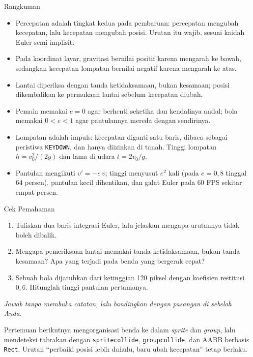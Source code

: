 \documentclass[aspectratio=169,10pt]{beamer}
\begin{document}
\begin{frame}{Rangkuman}
\begin{itemize}
  \item Percepatan adalah tingkat kedua pada pembaruan: percepatan mengubah
        kecepatan, lalu kecepatan mengubah posisi. Urutan itu wajib, sesuai
        kaidah Euler semi-implisit.
  \item Pada koordinat layar, gravitasi bernilai positif karena mengarah ke
        bawah, sedangkan kecepatan lompatan bernilai negatif karena mengarah
        ke atas.
  \item Lantai diperiksa dengan tanda ketidaksamaan, bukan kesamaan; posisi
        dikembalikan ke permukaan lantai sebelum kecepatan diubah.
  \item Pemain memakai $e = 0$ agar berhenti seketika dan kendalinya andal;
        bola memakai $0 < e < 1$ agar pantulannya mereda dengan sendirinya.
  \item Lompatan adalah impuls: kecepatan diganti satu baris, dibaca sebagai
        peristiwa \texttt{KEYDOWN}, dan hanya diizinkan di tanah. Tinggi
        lompatan $h = v_0^2/(2g)$ dan lama di udara $t = 2v_0/g$.
  \item Pantulan mengikuti $v' = -e\,v$; tinggi menyusut $e^2$ kali (pada
        $e = 0{,}8$ tinggal 64 persen), pantulan kecil dihentikan, dan galat
        Euler pada 60 FPS sekitar empat persen.
\end{itemize}
\end{frame}

\begin{frame}{Cek Pemahaman}
\begin{enumerate}
  \item Tuliskan dua baris integrasi Euler, lalu jelaskan mengapa urutannya
        tidak boleh dibalik.
  \item Mengapa pemeriksaan lantai memakai tanda ketidaksamaan, bukan tanda
        kesamaan? Apa yang terjadi pada benda yang bergerak cepat?
  \item Sebuah bola dijatuhkan dari ketinggian 120 piksel dengan koefisien
        restitusi $0{,}6$. Hitunglah tinggi pantulan pertamanya.
\end{enumerate}
\vspace{0.35cm}
{\footnotesize\color{ubMuted}\itshape Jawab tanpa membuka catatan, lalu
bandingkan dengan pasangan di sebelah Anda.}
\end{frame}

  {Pertemuan berikutnya mengorganisasi benda ke dalam \emph{sprite} dan
   \emph{group}, lalu mendeteksi tabrakan dengan \texttt{spritecollide},
   \texttt{groupcollide}, dan AABB berbasis \texttt{Rect}. Urutan ``perbaiki
   posisi lebih dahulu, baru ubah kecepatan'' tetap berlaku.}
\end{document}
